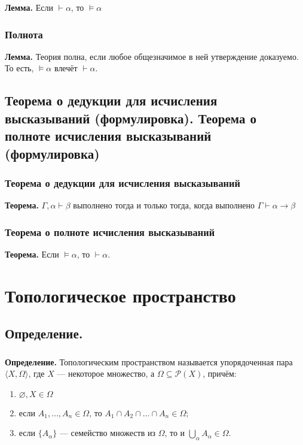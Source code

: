 \documentclass[10pt,a4paper,oneside]{article}
\begin{document}
\noindent \textbf{ Лемма. } Если $\vdash\alpha$, то $\models\alpha$

\subsubsection{Полнота}
\noindent \textbf{ Лемма. } Теория полна, если любое общезначимое в ней утверждение доказуемо.
То есть, $\models\alpha$ влечёт $\vdash\alpha$.

\subsection{Теорема о дедукции для исчисления высказываний (формулировка). Теорема о полноте исчисления высказываний (формулировка)}

\subsubsection{Теорема о дедукции для исчисления высказываний}

\noindent \textbf{ Теорема. }
$\Gamma,\alpha\vdash\beta$ выполнено тогда и только тогда, когда выполнено $\Gamma\vdash\alpha\rightarrow\beta$

\subsubsection{Теорема о полноте исчисления высказываний}
\noindent \textbf{ Теорема. }
Если $\models\alpha$, то $\vdash\alpha$.

\section{Топологическое пространство}
\subsection{Определение.}
\subsubsection{}
\noindent \textbf{ Определение. }
Топологическим пространством называется упорядоченная пара $\langle X, \Omega \rangle$,
где $X$ --- некоторое множество, а $\Omega \subseteq \mathcal{P}(X)$, причём:
\begin{enumerate}
\item $\varnothing, X \in \Omega$
\item если $A_1, \dots, A_n \in \Omega$, то $A_1 \cap A_2 \cap \dots \cap A_n \in \Omega$;
\item если $\{A_\alpha\}$ --- семейство множеств из $\Omega$, то и $\bigcup_\alpha A_\alpha \in \Omega$.
\end{enumerate}
\end{document}
